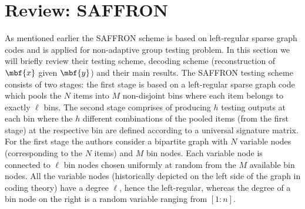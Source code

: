 \documentclass[conference,twocolumn]{IEEEtran}
\DeclareMathOperator*{\bigORtxt}{\scalerel*{\text{$\vee$}}{\textstyle\sum}}
\begin{document}
%

\section{Review: SAFFRON}
\label{Sec:PriorWork}
As mentioned earlier the SAFFRON scheme \cite{lee2015saffron} is based on left-regular sparse graph codes and is applied for non-adaptive group testing problem. In this section we will briefly review their testing scheme, decoding scheme (reconstruction of $\mbf{x}$ given $\mbf{y}$) and their main results. The SAFFRON testing scheme consists of two stages: the first stage is based on a left-regular sparse graph code which pools the $N$ items into $M$ non-disjoint bins where each item belongs to exactly $\ell$ bins. The second stage comprises of producing $h$ testing outputs at each bin where the $h$ different combinations of the pooled items (from the first stage) at the respective bin are defined according to a universal signature matrix. For the first stage the authors consider a bipartite graph with $N$ variable nodes (corresponding to the $N$ items) and $M$ bin nodes. Each variable node is connected to $\ell$ bin nodes chosen uniformly at random from the $M$ available bin nodes. All the variable nodes (historically depicted on the left side of the graph in coding theory) have a degree $\ell$, hence the left-regular, whereas the degree of a bin node on the right is a random variable ranging from $[1:n]$.
\end{document}
